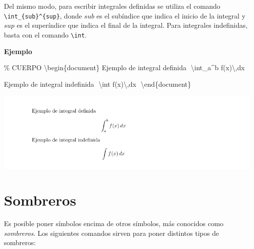 \documentclass[
  letterpaper,
  DIV=11,
  numbers=noendperiod]{scrreport}
\newenvironment{Shaded}{\begin{snugshade}}{\end{snugshade}}
\newcommand{\CommentTok}[1]{\textcolor[rgb]{0.37,0.37,0.37}{#1}}
\newcommand{\ExtensionTok}[1]{\textcolor[rgb]{0.00,0.23,0.31}{#1}}
\newcommand{\KeywordTok}[1]{\textcolor[rgb]{0.00,0.23,0.31}{#1}}
\newcommand{\NormalTok}[1]{\textcolor[rgb]{0.00,0.23,0.31}{#1}}
\newcommand{\SpecialCharTok}[1]{\textcolor[rgb]{0.37,0.37,0.37}{#1}}
\newcommand{\SpecialStringTok}[1]{\textcolor[rgb]{0.13,0.47,0.30}{#1}}
\begin{document}
Del mismo modo, para escribir integrales definidas se utiliza el comando
\texttt{\textbackslash{}int\_\{sub\}\^{}\{sup\}}, donde \(sub\) es el
subíndice que indica el inicio de la integral y \(sup\) es el
superíndice que indica el final de la integral. Para integrales
indefinidas, basta con el comando \texttt{\textbackslash{}int}.

\textbf{Ejemplo}

\begin{Shaded}
\begin{Highlighting}[]
\CommentTok{\% CUERPO}
\KeywordTok{\textbackslash{}begin}\NormalTok{\{}\ExtensionTok{document}\NormalTok{\}}
\NormalTok{Ejemplo de integral definida}
\SpecialStringTok{$$}
\SpecialCharTok{\textbackslash{}int}\SpecialStringTok{\_a\^{}b f(x)}\SpecialCharTok{\textbackslash{},}\SpecialStringTok{dx}
\SpecialStringTok{$$}

\NormalTok{Ejemplo de integral indefinida}
\SpecialStringTok{$$}
\SpecialCharTok{\textbackslash{}int}\SpecialStringTok{ f(x)}\SpecialCharTok{\textbackslash{},}\SpecialStringTok{dx}
\SpecialStringTok{$$}
\KeywordTok{\textbackslash{}end}\NormalTok{\{}\ExtensionTok{document}\NormalTok{\}}
\end{Highlighting}
\end{Shaded}

\begin{tcolorbox}[enhanced jigsaw, colback=white, colframe=quarto-callout-note-color-frame, title={Salida}, bottomtitle=1mm, colbacktitle=quarto-callout-note-color!10!white, bottomrule=.15mm, titlerule=0mm, opacityback=0, toptitle=1mm, arc=.35mm, left=2mm, rightrule=.15mm, toprule=.15mm, coltitle=black, leftrule=.75mm, opacitybacktitle=0.6, breakable]
\includegraphics{./img/formulas/integral.png}
\end{tcolorbox}

\hypertarget{sombreros}{%
\section{Sombreros}\label{sombreros}}

Es posible poner símbolos encima de otros símbolos, más conocidos como
\emph{sombreros}. Los siguientes comandos sirven para poner distintos
tipos de sombreros:
\end{document}
